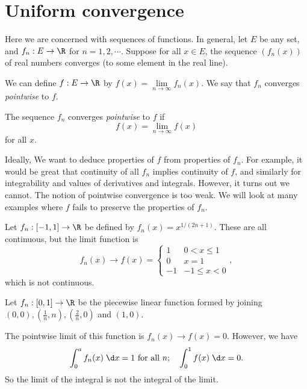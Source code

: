 \documentclass[a4paper]{article}
\begin{document}
\tableofcontents

\section{Uniform convergence}
Here we are concerned with sequences of functions. In general, let $E$ be any set, and $f_n: E\to \R$ for $n = 1, 2, \cdots$. Suppose for all $x\in E$, the sequence $(f_n(x))$ of real numbers converges (to some element in the real line).

We can define $f: E \to \R$ by $f(x) = \lim\limits_{n \to \infty} f_n(x)$. We say that $f_n$ converges \emph{pointwise} to $f$.

\begin{defi}
  The sequence $f_n$ converges \emph{pointwise} to $f$ if
  \[
    f(x) = \lim_{n\to \infty} f(x)
  \]
  for all $x$.
\end{defi}

Ideally, We want to deduce properties of $f$ from properties of $f_n$. For example, it would be great that continuity of all $f_n$ implies continuity of $f$, and similarly for integrability and values of derivatives and integrals. However, it turns out we cannot. The notion of pointwise convergence is too weak. We will look at many examples where $f$ fails to preserve the properties of $f_n$.

\begin{eg}
  Let $f_n: [-1, 1] \to \R$ be defined by $f_n(x) = x^{1/(2n + 1)}$. These are all continuous, but the limit function is
  \[
    f_n(x) \to f(x) =
    \begin{cases}
      1 & 0 < x \leq 1\\
      0 & x = 1\\
      -1 & -1 \leq x < 0
    \end{cases},
  \]
  which is not continuous.
\end{eg}

\begin{eg}
  Let $f_n: [0, 1] \to \R$ be the piecewise linear function formed by joining $(0, 0), (\frac{1}{n}, n), (\frac{2}{n}, 0)$ and $(1, 0)$.
  \begin{center}
  \end{center}
  The pointwise limit of this function is $f_n(x) \to f(x) = 0$. However, we have
  \[
    \int_0^a f_n(x)\;\d x = 1\text{ for all }n;\quad \int_0^1 f(x) \;\d x = 0.
  \]
  So the limit of the integral is not the integral of the limit.
\end{eg}
\end{document}
